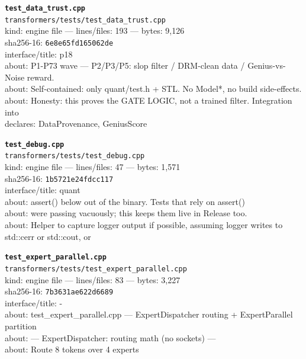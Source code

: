\noindent\textbf{\texttt{test\_data\_trust.cpp}}\\
\texttt{transformers/tests/test\_data\_trust.cpp}\\
kind: engine file --- lines/files: 193 --- bytes: 9,126\\
sha256-16: \texttt{6e8e65fd165062de}\\
interface/title: p18\\
about: P1-P73 wave — P2/P3/P5: slop filter / DRM-clean data / Genius-vs-Noise reward.\\
about: Self-contained: only quant/test.h + STL. No Model*, no build side-effects.\\
about: Honesty: this proves the GATE LOGIC, not a trained filter. Integration into\\
declares: DataProvenance, GeniusScore\\
\vspace*{6.0pt}

\noindent\textbf{\texttt{test\_debug.cpp}}\\
\texttt{transformers/tests/test\_debug.cpp}\\
kind: engine file --- lines/files: 47 --- bytes: 1,571\\
sha256-16: \texttt{1b5721e24fdcc117}\\
interface/title: quant\\
about: assert() below out of the binary. Tests that rely on assert()\\
about: were passing vacuously; this keeps them live in Release too.\\
about: Helper to capture logger output if possible, assuming logger writes to std::cerr or std::cout, or\\
\vspace*{6.0pt}

\noindent\textbf{\texttt{test\_expert\_parallel.cpp}}\\
\texttt{transformers/tests/test\_expert\_parallel.cpp}\\
kind: engine file --- lines/files: 83 --- bytes: 3,227\\
sha256-16: \texttt{7b3631ae622d6689}\\
interface/title: -\\
about: test\_expert\_parallel.cpp — ExpertDispatcher routing + ExpertParallel partition\\
about: --- ExpertDispatcher: routing math (no sockets) ---\\
about: Route 8 tokens over 4 experts\\
\vspace*{6.0pt}
\newpage

